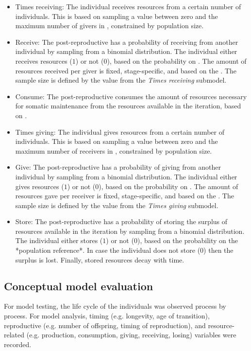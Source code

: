 \documentclass{article}
\begin{document}
\begin{itemize}
\begin{itemize}
        \item Times receiving: The individual receives resources from a certain number of individuals. This is based on sampling a value between zero and the maximum number of givers in \cite{gurven2004give}, constrained by population size.
        \item Receive: The post-reproductive has a probability of receiving from another individual by sampling from a binomial distribution. The individual either receives resources ($1$) or not ($0$), based on the probability on \cite{gurven2004give}. The amount of resources received per giver is fixed, stage-specific, and based on the \cite{gurven2004give}. The sample size is defined by the value from the \emph{Times receiving} submodel. 
        \item Consume: The post-reproductive consumes the amount of resources necessary for somatic maintenance from the resources available in the iteration, based on \cite{kaplan2000theory}.
        \item Times giving: The individual gives resources from a certain number of individuals. This is based on sampling a value between zero and the maximum number of receivers in \cite{gurven2004give}, constrained by population size.
        \item Give: The post-reproductive has a probability of giving from another individual by sampling from a binomial distribution. The individual either gives resources ($1$) or not ($0$), based on the probability on \cite{gurven2004give}. The amount of resources gave per receiver is fixed, stage-specific, and based on the \cite{gurven2004give}. The sample size is defined by the value from the \emph{Times giving} submodel. 
        \item Store: The post-reproductive has a probability of storing the surplus of resources available in the iteration by sampling from a binomial distribution. The individual either stores ($1$) or not ($0$), based on the probability on the *population reference*. In case the individual does not store ($0$) then the surplus is lost. Finally, stored resources decay with time.
    \end{itemize}
\end{itemize}

\subsection{Conceptual model evaluation}

For model testing, the life cycle of the individuals was observed process by process. For model analysis, timing (e.g. longevity, age of transition), reproductive (e.g. number of offspring, timing of reproduction), and resource-related (e.g. production, consumption, giving, receiving, losing) variables were recorded.
\end{document}
